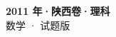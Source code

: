 \documentclass[zihao=-4, a4paper]{ctexart}
\begin{document}
\begin{center}
  {\Large\bfseries 2011 年·陕西卷·理科}\\[4pt]
  {\large 数学 · 试题版}
\end{center}
\medskip
{}

\end{document}
